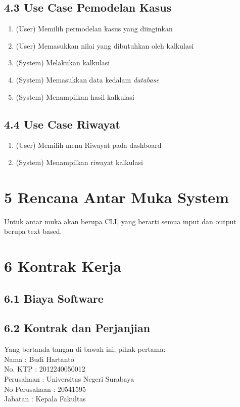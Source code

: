 \documentclass[a4paper]{article}
\begin{document}
    \subsection*{4.3 Use Case Pemodelan Kasus}
    \begin{enumerate}
        \item (User) Memilih permodelan kasus yang diinginkan
        \item (User) Memasukkan nilai yang dibutuhkan oleh kalkulasi
        \item (System) Melakukan kalkulasi
        \item (System) Memasukkan data kedalam \textit{database}
        \item (System) Menampilkan hasil kalkulasi
    \end{enumerate}
    \subsection*{4.4 Use Case Riwayat}
    \begin{enumerate}
        \item (User) Memilih menu Riwayat pada dashboard
        \item (System) Menampilkan riwayat kalkulasi
    \end{enumerate}
\section*{5 Rencana Antar Muka System}
\noindent Untuk antar muka akan berupa CLI, yang berarti semua input dan
output berupa text based.
\section*{6 Kontrak Kerja}
    \subsection*{6.1 Biaya Software}

    \subsection*{6.2 Kontrak dan Perjanjian}
    \noindent Yang bertanda tangan di bawah ini, pihak pertama:\\
    \noindent
    Nama 			: Budi Hartanto \\
    No. KTP 		: 2012240050012 \\
    Perusahaan 		: Universitas Negeri Surabaya \\
    No Perusahaan   : 20541595 \\
    Jabatan 		: Kepala Fakultas \\
\end{document}
